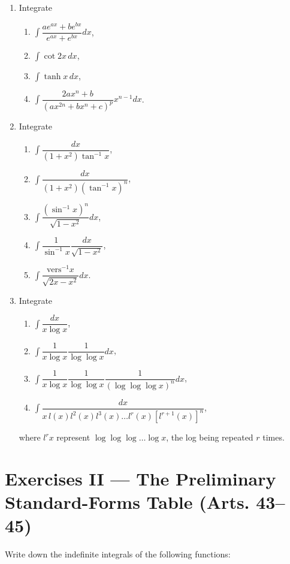 \documentclass[11pt, a4paper]{article}
\begin{document}
\begin{enumerate}[leftmargin=2em]
\item Integrate
\begin{enumerate}[label=(\roman*)]
\item $\displaystyle\int \dfrac{ae^{ax}+be^{bx}}{e^{ax}+e^{bx}}dx$,
\item $\displaystyle\int \cot 2x\, dx$,
\item $\displaystyle\int \tanh x\, dx$,
\item $\displaystyle\int \dfrac{2ax^n+b}{(ax^{2n}+bx^n+c)^p}x^{n-1}dx$.
\end{enumerate}

\item Integrate
\begin{enumerate}[label=(\roman*)]
\item $\displaystyle\int \dfrac{dx}{(1+x^2)\tan^{-1}x}$,
\item $\displaystyle\int \dfrac{dx}{(1+x^2)(\tan^{-1}x)^n}$,
\item $\displaystyle\int \dfrac{(\sin^{-1}x)^n}{\sqrt{1-x^2}}dx$,
\item $\displaystyle\int \dfrac{1}{\sin^{-1}x}\dfrac{dx}{\sqrt{1-x^2}}$,
\item $\displaystyle\int \dfrac{\text{vers}^{-1}x}{\sqrt{2x-x^2}}dx$.
\end{enumerate}

\item Integrate
\begin{enumerate}[label=(\roman*)]
\item $\displaystyle\int \dfrac{dx}{x\log x}$,
\item $\displaystyle\int \dfrac{1}{x\log x}\dfrac{1}{\log\log x}dx$,
\item $\displaystyle\int \dfrac{1}{x\log x}\dfrac{1}{\log\log x}\dfrac{1}{(\log\log\log x)^n}dx$,
\item $\displaystyle\int \dfrac{dx}{x\, l(x)l^2(x)l^3(x)\dots l^r(x)[l^{r+1}(x)]^n}$,
\end{enumerate}
where $l^r x$ represent $\log\log\log\dots\log x$, the log being repeated $r$ times.

\end{enumerate}

\section*{Exercises II --- The Preliminary Standard-Forms Table (Arts. 43--45)}

Write down the indefinite integrals of the following functions:
\end{document}
